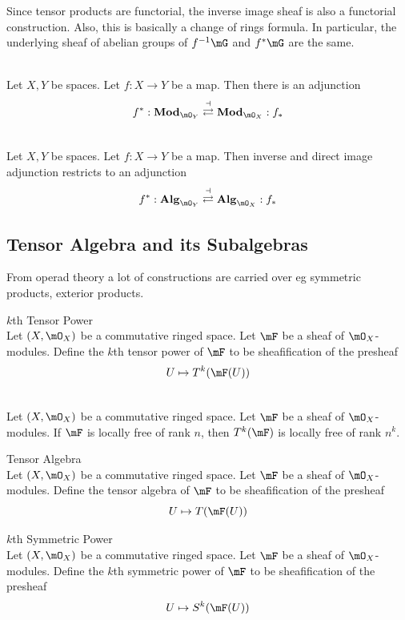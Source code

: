 \documentclass[a4paper]{article}
\begin{document}
Since tensor products are functorial, the inverse image sheaf is also a functorial construction. Also, this is basically a change of rings formula. In particular, the underlying sheaf of abelian groups of $f^{-1}\mG$ and $f^\ast\mG$ are the same. 

\begin{lmm}{}{}\\
Let $X,Y$ be spaces. Let $f:X\to Y$ be a map. Then there is an adjunction $$f^\ast:\bold{Mod}_{\mO_Y}\overset{\dashv}{\rightleftarrows}\bold{Mod}_{\mO_X}:f_\ast$$
\end{lmm}

\begin{lmm}{}{}\\
Let $X,Y$ be spaces. Let $f:X\to Y$ be a map. Then inverse and direct image adjunction restricts to an adjunction $$f^\ast:\bold{Alg}_{\mO_Y}\overset{\dashv}{\rightleftarrows}\bold{Alg}_{\mO_X}:f_\ast$$
\end{lmm}

\subsection{Tensor Algebra and its Subalgebras}
From operad theory a lot of constructions are carried over eg symmetric products, exterior products. 

\begin{defn}{$k$th Tensor Power}{}\\
Let $(X,\mO_X)$ be a commutative ringed space. Let $\mF$ be a sheaf of $\mO_X$-modules. Define the $k$th tensor power of $\mF$ to be sheafification of the presheaf $$U\mapsto T^k(\mF(U))$$
\end{defn}

\begin{lmm}{}{}\\
Let $(X,\mO_X)$ be a commutative ringed space. Let $\mF$ be a sheaf of $\mO_X$-modules. If $\mF$ is locally free of rank $n$, then $T^k(\mF)$ is locally free of rank $n^k$. 
\end{lmm}

\begin{defn}{Tensor Algebra}{}\\
Let $(X,\mO_X)$ be a commutative ringed space. Let $\mF$ be a sheaf of $\mO_X$-modules. Define the tensor algebra of $\mF$ to be sheafification of the presheaf $$U\mapsto T(\mF(U))$$
\end{defn}

\begin{defn}{$k$th Symmetric Power}{}\\
Let $(X,\mO_X)$ be a commutative ringed space. Let $\mF$ be a sheaf of $\mO_X$-modules. Define the $k$th symmetric power of $\mF$ to be sheafification of the presheaf $$U\mapsto S^k(\mF(U))$$
\end{defn}
\end{document}
